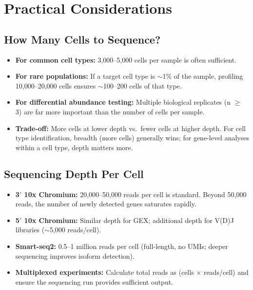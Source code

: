 \section{Practical Considerations}
\label{sec:scrnaseq:practical}

\subsection{How Many Cells to Sequence?}

\begin{itemize}[nosep]
  \item \textbf{For common cell types:} 3,000--5,000 cells per sample is often
    sufficient.
  \item \textbf{For rare populations:} If a target cell type is $\sim$1\% of
    the sample, profiling 10,000--20,000 cells ensures $\sim$100--200 cells of
    that type.
  \item \textbf{For differential abundance testing:} Multiple biological
    replicates (n $\geq$ 3) are far more important than the number of cells per
    sample.
  \item \textbf{Trade-off:} More cells at lower depth vs.\ fewer cells at
    higher depth. For cell type identification, breadth (more cells) generally
    wins; for gene-level analyses within a cell type, depth matters more.
\end{itemize}

\subsection{Sequencing Depth Per Cell}

\begin{itemize}[nosep]
  \item \textbf{3$'$ 10x Chromium:} 20,000--50,000 reads per cell is standard.
    Beyond 50,000 reads, the number of newly detected genes saturates rapidly.
  \item \textbf{5$'$ 10x Chromium:} Similar depth for GEX; additional depth for
    V(D)J libraries ($\sim$5,000 reads/cell).
  \item \textbf{Smart-seq2:} 0.5--1 million reads per cell (full-length,
    no UMIs; deeper sequencing improves isoform detection).
  \item \textbf{Multiplexed experiments:} Calculate total reads as
    (cells $\times$ reads/cell) and ensure the sequencing run provides
    sufficient output.
\end{itemize}

